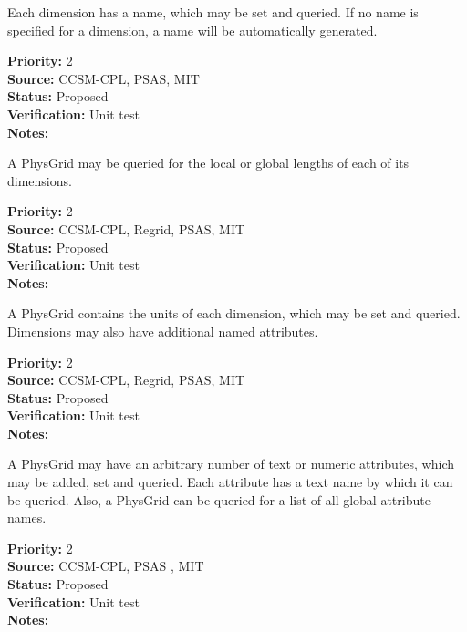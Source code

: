 Each dimension has a name, which may be set and queried.  If no name is specified
for a dimension, a name will be automatically generated.
\begin{reqlist}
{\bf Priority:} 2 \\
{\bf Source:} CCSM-CPL, 
PSAS, MIT \\
{\bf Status:} Proposed \\
{\bf Verification:} Unit test \\
{\bf Notes:} 
\end{reqlist}

A PhysGrid may be queried for the local or global lengths of each of its dimensions.
\begin{reqlist}
{\bf Priority:} 2 \\
{\bf Source:} CCSM-CPL, Regrid, 
PSAS, MIT \\
{\bf Status:} Proposed \\
{\bf Verification:} Unit test \\
{\bf Notes:} 
\end{reqlist}

A PhysGrid contains the units of each dimension, which may be set and queried. 
Dimensions may also have additional named attributes.
\begin{reqlist}
{\bf Priority:} 2 \\
{\bf Source:} CCSM-CPL, Regrid, 
PSAS, MIT  \\
{\bf Status:} Proposed \\
{\bf Verification:} Unit test \\
{\bf Notes:} 
\end{reqlist}

A PhysGrid may have an arbitrary number of text or numeric attributes,
which may be added, set and queried.  Each attribute has a text name by which it
can be queried.  Also, a PhysGrid can be queried for a list of all global
attribute names.

\begin{reqlist}
{\bf Priority:} 2 \\
{\bf Source:} CCSM-CPL, 
PSAS , MIT \\
{\bf Status:} Proposed \\
{\bf Verification:} Unit test \\
{\bf Notes:} 
\end{reqlist}

